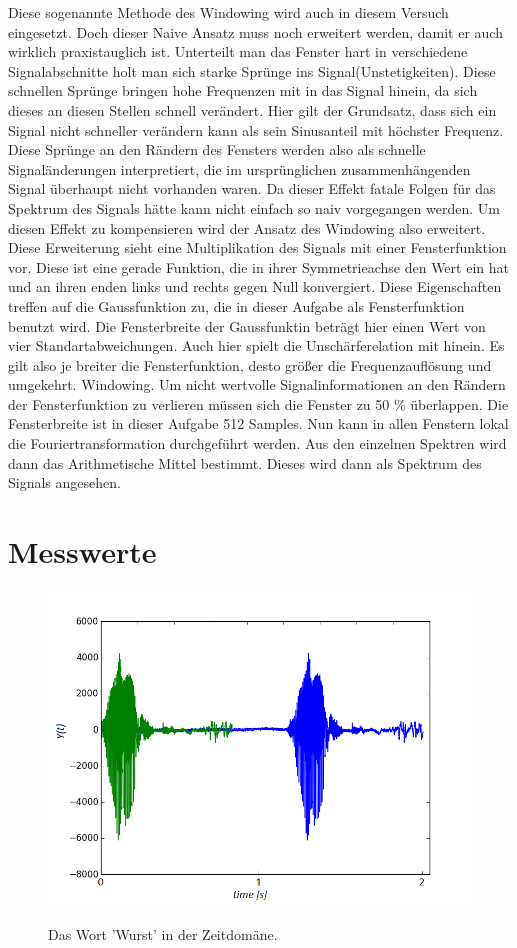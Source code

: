 Diese sogenannte Methode des Windowing wird auch in diesem Versuch eingesetzt. Doch dieser Naive Ansatz muss noch erweitert werden, damit er auch wirklich praxistauglich ist. Unterteilt man das Fenster hart in verschiedene Signalabschnitte holt man sich starke Sprünge ins Signal(Unstetigkeiten). Diese schnellen Sprünge bringen hohe Frequenzen mit in das Signal hinein, da sich dieses an diesen Stellen schnell verändert. Hier gilt der Grundsatz, dass sich ein Signal nicht schneller verändern kann als sein Sinusanteil mit höchster Frequenz.
Diese Sprünge an den Rändern des Fensters werden also als schnelle Signaländerungen interpretiert, die im ursprünglichen zusammenhängenden Signal überhaupt nicht vorhanden waren.
Da dieser Effekt fatale Folgen für das Spektrum des Signals hätte kann nicht einfach so naiv vorgegangen werden.
Um diesen Effekt zu kompensieren wird der Ansatz des Windowing also erweitert. Diese Erweiterung sieht eine Multiplikation des Signals mit einer Fensterfunktion vor. Diese ist eine gerade Funktion, die in ihrer Symmetrieachse den Wert ein hat und an ihren enden links und rechts gegen Null konvergiert. Diese Eigenschaften treffen auf die Gaussfunktion zu, die in dieser Aufgabe als Fensterfunktion benutzt wird. Die Fensterbreite der Gaussfunktin beträgt hier einen Wert von vier Standartabweichungen.
Auch hier spielt die Unschärferelation mit hinein. Es gilt also je breiter die Fensterfunktion, desto größer die Frequenzauflösung und umgekehrt. \cite[S.21]{Franz2015c} Windowing. Um nicht wertvolle Signalinformationen an den Rändern der Fensterfunktion zu verlieren müssen sich die Fenster zu 50 \% überlappen. Die Fensterbreite ist in dieser Aufgabe 512 Samples. 
Nun kann in allen Fenstern lokal die Fouriertransformation durchgeführt werden. Aus den einzelnen Spektren wird dann das Arithmetische Mittel bestimmt. Dieses wird dann als Spektrum des Signals angesehen.

\newpage
\section{Messwerte}
\label{chap:VERSUCH_1_MESSWERTE}
\begin{figure}[H]
\includegraphics[width=\textwidth]{media/triggertest.png}
\label{fig:Wurst_Triggered}
\caption{Das Wort 'Wurst' in der Zeitdomäne.}
\end{figure}

